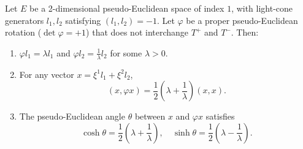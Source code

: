 Let $E$ be a 2-dimensional pseudo-Euclidean space of index $1$, with light-cone generators $l_1, l_2$ satisfying $(l_1, l_2) = -1$. Let $\varphi$ be a proper pseudo-Euclidean rotation ($\det \varphi = +1$) that does not interchange $T^+$ and $T^-$. Then:

\begin{enumerate}
  \item $\varphi l_1 = \lambda l_1$ and $\varphi l_2 = \frac{1}{\lambda} l_2$ for some $\lambda > 0$.
  \item For any vector $x = \xi^1 l_1 + \xi^2 l_2$,
    $$(x, \varphi x) = \frac{1}{2}\left(\lambda + \frac{1}{\lambda}\right)(x, x).$$
  \item The pseudo-Euclidean angle $\theta$ between $x$ and $\varphi x$ satisfies
    $$\cosh \theta = \frac{1}{2}\left(\lambda + \frac{1}{\lambda}\right), \quad \sinh \theta = \frac{1}{2}\left(\lambda - \frac{1}{\lambda}\right).$$
\end{enumerate}
